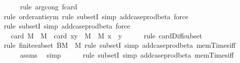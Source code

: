 \begin{isabellebody}
\ \ \ \ \isamarkupfalse%
\ {\isacharparenleft}{\kern0pt}rule\ arg{\isacharunderscore}{\kern0pt}cong{\isacharbrackleft}{\kern0pt}\ f{\isacharequal}{\kern0pt}{\isachardoublequoteopen}card{\isachardoublequoteclose}{\isacharbrackright}{\kern0pt}{\isacharparenright}{\kern0pt}\isanewline
\ \ \ \ \isamarkupfalse%
\ {\isacharparenleft}{\kern0pt}rule\ order{\isacharunderscore}{\kern0pt}antisym{\isacharcomma}{\kern0pt}\ rule\ subsetI{\isacharcomma}{\kern0pt}\ simp\ add{\isacharcolon}{\kern0pt}case{\isacharunderscore}{\kern0pt}prod{\isacharunderscore}{\kern0pt}beta{\isacharcomma}{\kern0pt}\ force{\isacharparenright}{\kern0pt}\isanewline
\ \ \ \ \isamarkupfalse%
\ {\isacharparenleft}{\kern0pt}rule\ subsetI{\isacharcomma}{\kern0pt}\ simp\ add{\isacharcolon}{\kern0pt}case{\isacharunderscore}{\kern0pt}prod{\isacharunderscore}{\kern0pt}beta{\isacharcomma}{\kern0pt}\ force{\isacharparenright}{\kern0pt}\isanewline
\ \ \isamarkupfalse%
\ \isamarkupfalse%
\ {\isachardoublequoteopen}{\isachardot}{\kern0pt}{\isachardot}{\kern0pt}{\isachardot}{\kern0pt}\ {\isacharequal}{\kern0pt}\ card\ {\isacharparenleft}{\kern0pt}M\ {\isasymtimes}\ M{\isacharparenright}{\kern0pt}\ {\isacharminus}{\kern0pt}\ card\ {\isacharbraceleft}{\kern0pt}{\isacharparenleft}{\kern0pt}x{\isacharcomma}{\kern0pt}y{\isacharparenright}{\kern0pt}\ {\isasymin}\ M\ {\isasymtimes}\ M{\isachardot}{\kern0pt}\ x\ {\isacharequal}{\kern0pt}\ y{\isacharbraceright}{\kern0pt}{\isachardoublequoteclose}\isanewline
\ \ \ \ \isamarkupfalse%
\ {\isacharparenleft}{\kern0pt}rule\ card{\isacharunderscore}{\kern0pt}Diff{\isacharunderscore}{\kern0pt}subset{\isacharparenright}{\kern0pt}\isanewline
\ \ \ \ \isamarkupfalse%
\ {\isacharparenleft}{\kern0pt}rule\ finite{\isacharunderscore}{\kern0pt}subset{\isacharbrackleft}{\kern0pt}\ B{\isacharequal}{\kern0pt}{\isachardoublequoteopen}M\ {\isasymtimes}\ M{\isachardoublequoteclose}{\isacharbrackright}{\kern0pt}{\isacharcomma}{\kern0pt}\ rule\ subsetI{\isacharcomma}{\kern0pt}\ simp\ add{\isacharcolon}{\kern0pt}case{\isacharunderscore}{\kern0pt}prod{\isacharunderscore}{\kern0pt}beta\ mem{\isacharunderscore}{\kern0pt}Times{\isacharunderscore}{\kern0pt}iff{\isacharparenright}{\kern0pt}\isanewline
\ \ \ \ \isamarkupfalse%
\ assms\ \isamarkupfalse%
\ simp\isanewline
\ \ \ \ \isamarkupfalse%
\ {\isacharparenleft}{\kern0pt}rule\ subsetI{\isacharcomma}{\kern0pt}\ simp\ add{\isacharcolon}{\kern0pt}case{\isacharunderscore}{\kern0pt}prod{\isacharunderscore}{\kern0pt}beta\ mem{\isacharunderscore}{\kern0pt}Times{\isacharunderscore}{\kern0pt}iff{\isacharparenright}{\kern0pt}\isanewline

\end{isabellebody}
